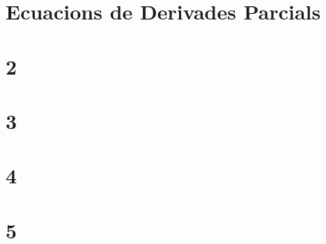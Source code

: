 \documentclass[a4paper,12pt]{article}
\author{EDUARDO PÉREZ MOTATO}
\begin{document}
    
    \tableofcontents
    \section{Ecuacions de Derivades Parcials}
    
    \section{2}
    
    \section{3}
    
    \section{4}
    
    \section{5}
    
\end{document}
